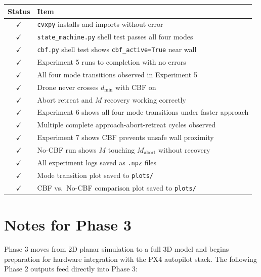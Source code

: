 \documentclass[12pt]{article}
\begin{document}
\begin{center}
\begin{tabular}{cl}
\toprule
\textbf{Status} & \textbf{Item} \\
\midrule
$\checkmark$ & \texttt{cvxpy} installs and imports without error \\
$\checkmark$ & \texttt{state\_machine.py} shell test passes all four
               modes \\
$\checkmark$ & \texttt{cbf.py} shell test shows
               \texttt{cbf\_active=True} near wall \\
$\checkmark$ & Experiment 5 runs to completion with no errors \\
$\checkmark$ & All four mode transitions observed in Experiment 5 \\
$\checkmark$ & Drone never crosses $d_{\min}$ with CBF on \\
$\checkmark$ & Abort retreat and $M$ recovery working correctly \\
$\checkmark$ & Experiment 6 shows all four mode transitions under
               faster approach \\
$\checkmark$ & Multiple complete approach-abort-retreat cycles
               observed \\
$\checkmark$ & Experiment 7 shows CBF prevents unsafe wall proximity
               \\
$\checkmark$ & No-CBF run shows $M$ touching $M_\mathrm{abort}$
               without recovery \\
$\checkmark$ & All experiment logs saved as \texttt{.npz} files \\
$\checkmark$ & Mode transition plot saved to \texttt{plots/} \\
$\checkmark$ & CBF vs.\ No-CBF comparison plot saved to
               \texttt{plots/} \\
\bottomrule
\end{tabular}
\end{center}

\section{Notes for Phase 3}

Phase 3 moves from 2D planar simulation to a full 3D model and
begins preparation for hardware integration with the PX4 autopilot
stack. The following Phase 2 outputs feed directly into Phase 3:
\end{document}
